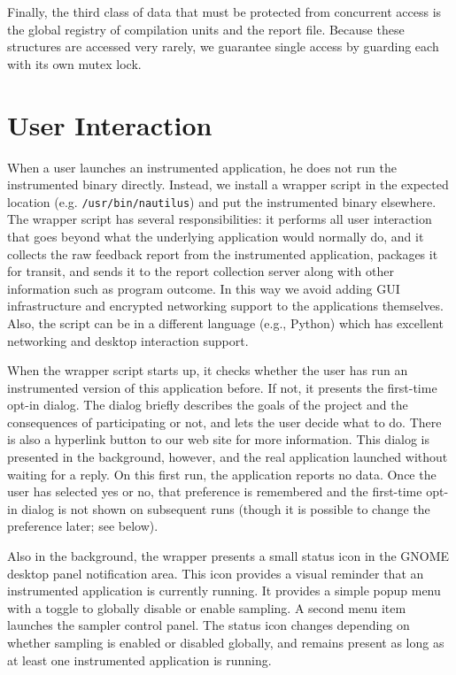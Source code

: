\documentclass[10pt,twocolumn]{article}
\begin{document}
Finally, the third class of data that must be protected from concurrent access
is the global registry of compilation units and the report file.
Because these structures are accessed very rarely, we guarantee single 
access by guarding each with its own mutex lock.


\section{User Interaction}

When a user launches an instrumented application, he does not run the
instrumented binary directly.  Instead, we install a wrapper script in
the expected location (e.g. \texttt{/usr/bin/nautilus}) and put the
instrumented binary elsewhere.  The wrapper script has several
responsibilities:  it performs all user interaction
that goes beyond what the underlying application would normally do, and
it collects the raw feedback report from the instrumented
application, packages it for transit, and sends it to the report
collection server along with other information such as program
outcome.  In this way we avoid adding GUI infrastructure and
encrypted networking support to the applications themselves.
Also, the script can be in a different language (e.g., Python)
which has excellent networking and desktop interaction support.

When the wrapper script starts up, it checks whether the user has run
an instrumented version of this application before.  If not, it
presents the first-time opt-in dialog.  The dialog briefly describes the
goals of the project and the consequences of participating or not, and
lets the user decide what to do.  There is also a hyperlink button to
our web site for more information.  This dialog is presented in the
background, however, and the real application launched without waiting
for a reply.  On this first run, the application 
reports no data.  
Once the user has selected yes or no, that preference is
remembered and the first-time opt-in dialog is not shown on subsequent
runs (though it is possible to change the preference later; see below).

Also in the background, the wrapper presents a small status icon in
the GNOME desktop panel notification area.  This icon provides a
visual reminder that an instrumented application is currently running.
It provides a simple popup menu with a toggle to globally disable or
enable sampling.  A second menu item launches the sampler control
panel.  The status icon changes depending on whether sampling is
enabled or disabled globally, and remains present as long as at least
one instrumented application is running.  
\end{document}
